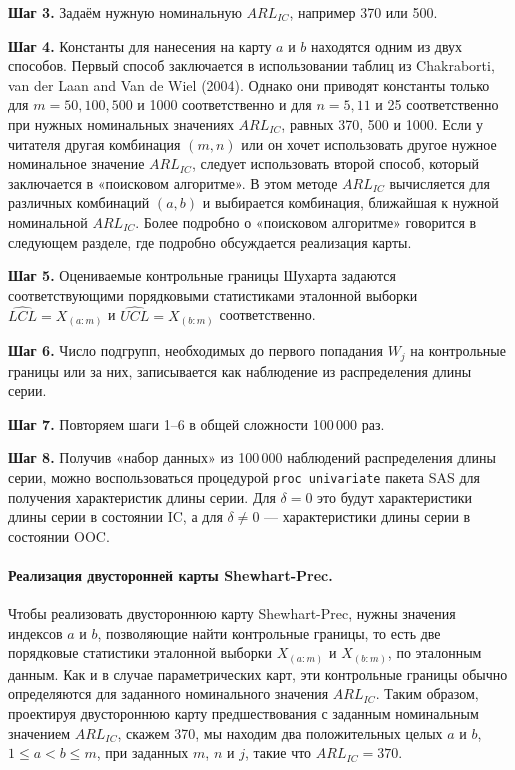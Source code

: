 \noindent\textbf{Шаг 3.} Задаём нужную номинальную \(ARL_{IC}\), например 370 или 500.

\noindent\textbf{Шаг 4.} Константы для нанесения на карту \(a\) и \(b\) находятся одним из двух способов. Первый способ заключается в использовании таблиц из Chakraborti, van der Laan and Van de Wiel (2004). Однако они приводят константы только для \(m = 50, 100, 500\) и 1000 соответственно и для \(n = 5, 11\) и 25 соответственно при нужных номинальных значениях \(ARL_{IC}\), равных 370, 500 и 1000. Если у читателя другая комбинация \((m, n)\) или он хочет использовать другое нужное номинальное значение \(ARL_{IC}\), следует использовать второй способ, который заключается в «поисковом алгоритме». В этом методе \(ARL_{IC}\) вычисляется для различных комбинаций \((a, b)\) и выбирается комбинация, ближайшая к нужной номинальной \(ARL_{IC}\). Более подробно о «поисковом алгоритме» говорится в следующем разделе, где подробно обсуждается реализация карты.

\noindent\textbf{Шаг 5.} Оцениваемые контрольные границы Шухарта задаются соответствующими порядковыми статистиками эталонной выборки \(\widehat{LCL} = X_{(a:m)}\) и \(\widehat{UCL} = X_{(b:m)}\) соответственно.

\noindent\textbf{Шаг 6.} Число подгрупп, необходимых до первого попадания \(W_j\) на контрольные границы или за них, записывается как наблюдение из распределения длины серии.

\noindent\textbf{Шаг 7.} Повторяем шаги 1--6 в общей сложности 100\,000 раз.

\noindent\textbf{Шаг 8.} Получив «набор данных» из 100\,000 наблюдений распределения длины серии, можно воспользоваться процедурой \texttt{proc univariate} пакета SAS для получения характеристик длины серии. Для \(\delta = 0\) это будут характеристики длины серии в состоянии IC, а для \(\delta \ne 0\) --- характеристики длины серии в состоянии OOC.

\paragraph{Реализация двусторонней карты Shewhart-Prec.} Чтобы реализовать двустороннюю карту Shewhart-Prec, нужны значения индексов \(a\) и \(b\), позволяющие найти контрольные границы, то есть две порядковые статистики эталонной выборки \(X_{(a:m)}\) и \(X_{(b:m)}\), по эталонным данным. Как и в случае параметрических карт, эти контрольные границы обычно определяются для заданного номинального значения \(ARL_{IC}\). Таким образом, проектируя двустороннюю карту предшествования с заданным номинальным значением \(ARL_{IC}\), скажем 370, мы находим два положительных целых \(a\) и \(b\), \(1 \le a < b \le m\), при заданных \(m\), \(n\) и \(j\), такие что \(ARL_{IC} = 370\).

